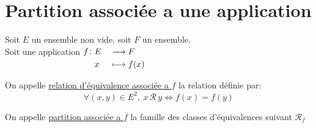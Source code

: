 \documentclass[12pt,twoside,a4paper]{article}
\begin{document}
	\section{Partition associ\'ee a une application}
		Soit $E$ un ensemble non vide, soit $F$ un ensemble.\\
		Soit une application $\begin{aligned}[t]f\colon&E&&\longrightarrow F \\&x&&\longmapsto f(x)\end{aligned}$
		\begin{defi}
			On appelle \underline{relation d'\'equivalence associ\'ee a $f$} la relation d\'efinie par:\\
			$$\forall(x,y)\in E^2,\ x\,\mathcal{R}\,y\iff f(x)=f(y)$$
		\end{defi}
		\begin{defi}
			On appelle \underline{partition associ\'ee a $f$} la famille des classes d'\'equivalences suivant $\mathcal{R}_f$
		\end{defi}
\end{document}

